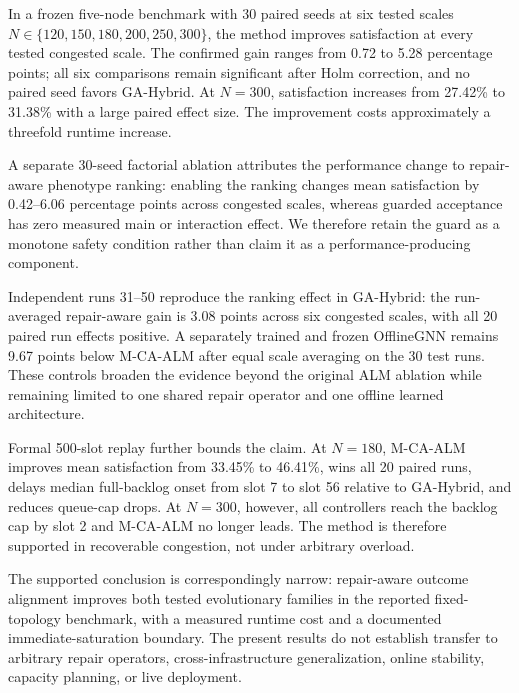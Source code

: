 \documentclass[pdflatex,sn-mathphys-num]{sn-jnl}
\begin{document}
In a frozen five-node benchmark with 30 paired seeds at six tested scales 
$N\in\{120,150,180,200,250,300\}$, the method improves satisfaction at 
every tested congested scale. The confirmed gain ranges from 0.72 to 5.28 
percentage points; all six comparisons remain significant after Holm 
correction, and no paired seed favors GA-Hybrid. At $N=300$, satisfaction 
increases from 27.42\% to 31.38\% with a large paired effect size. The 
improvement costs approximately a threefold runtime increase.

A separate 30-seed factorial ablation attributes the performance change to repair-aware phenotype ranking: enabling the ranking changes mean satisfaction by 0.42--6.06 percentage points across congested scales, whereas guarded acceptance has zero measured main or interaction effect. We therefore retain the guard as a monotone safety condition rather than claim it as a performance-producing component.

Independent runs 31--50 reproduce the ranking effect in GA-Hybrid: the run-averaged repair-aware gain is 3.08 points across six congested scales, with all 20 paired run effects positive. A separately trained and frozen OfflineGNN remains 9.67 points below M-CA-ALM after equal scale averaging on the 30 test runs. These controls broaden the evidence beyond the original ALM ablation while remaining limited to one shared repair operator and one offline learned architecture.

Formal 500-slot replay further bounds the claim. At $N=180$, M-CA-ALM improves mean satisfaction from 33.45\% to 46.41\%, wins all 20 paired runs, delays median full-backlog onset from slot 7 to slot 56 relative to GA-Hybrid, and reduces queue-cap drops. At $N=300$, however, all controllers reach the backlog cap by slot 2 and M-CA-ALM no longer leads. The method is therefore supported in recoverable congestion, not under arbitrary overload.

The supported conclusion is correspondingly narrow: repair-aware outcome alignment improves both tested evolutionary families in the reported fixed-topology benchmark, with a measured runtime cost and a documented immediate-saturation boundary. The present results do not establish transfer to arbitrary repair operators, cross-infrastructure generalization, online stability, capacity planning, or live deployment.

\end{document}

